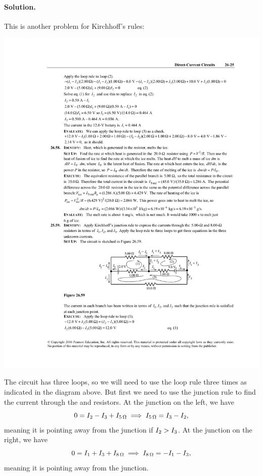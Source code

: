 \documentclass[11pt]{article}
\newcommand{\beq}{\begin{equation*}}
\newcommand{\eeq}{\end{equation*}}
\newenvironment{solution}
{
    \paragraph{Solution.}
    \ignorespaces
}
{
    \bigskip
}
\begin{document}
\begin{solution}
	This is another problem for Kirchhoff's rules:
	
	\begin{center}
		\includegraphics{A26-59}
	\end{center}
	
		The circuit has three loops, so we will need to use the loop rule three times as indicated in the diagram above.  But first we need to use the junction rule to find the current through the  and  resistors.  At the junction on the left, we have
	\beq
		0 = \Iw - \Ie + I_{\Sohm{5}}
		\implies
		I_{\Sohm{5}} = \Ie - \Iw,
	\eeq
	meaning it is pointing away from the junction if $I_2 > I_3$.  At the junction on the right, we have
	\beq
		0 = \Iq + \Ie + I_{\Sohm{8}}
		\implies
		I_{\Sohm{8}} = -\Iq - \Ie,
	\eeq
	meaning it is pointing away from the junction.
	

\end{solution}
\end{document}

